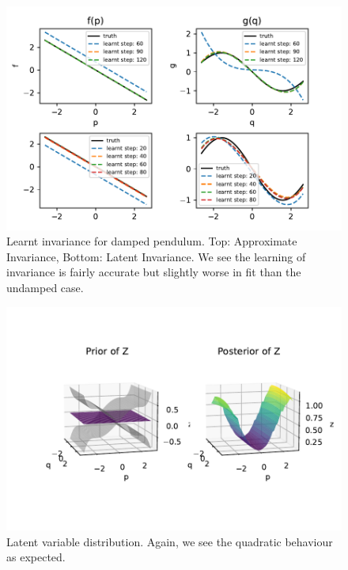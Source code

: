 \documentclass{statsmsc}
\begin{document}
\begin{figure}[H] 
  \includegraphics[width=0.8\linewidth]{../codes/figures/damped_pendulum_learnt_over_time.pdf}
  \centering
  \caption{Learnt invariance for damped pendulum. Top: Approximate Invariance, Bottom: Latent Invariance. We see the learning of invariance is fairly accurate but slightly worse in fit than the undamped case.}
  \label{fig:damped_pendulum_learnt}
\end{figure}

\begin{figure}[H] 
  \includegraphics[width=0.8\linewidth]{../codes/figures/latent_damped_pendulum.pdf}
  \centering
  \caption{Latent variable distribution. Again, we see the quadratic behaviour as expected.}
  \label{fig:latent_damped_pendulum}
\end{figure}
\end{document}
